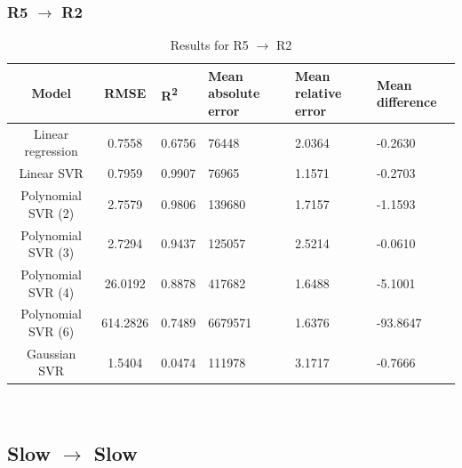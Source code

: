 \documentclass[a4paper,11pt]{article}
\begin{document}
\subsubsection{R5 $\rightarrow$ R2}
\begin{table}[H]
	\centering
	\begin{adjustbox}{center}
		\begin{tabular}{c | c M{1.2cm} M{2.5cm} M{2.5cm} M{1.8cm}}
			Model & RMSE & R\textsuperscript{2} & Mean absolute error & Mean relative error & Mean difference \tabularnewline
			\hline
			Linear regression & 0.7558 & 0.6756 &  76448 & 2.0364 & -0.2630 \\
			Linear SVR & 0.7959 & 0.9907 &  76965 & 1.1571 & -0.2703 \\
			Polynomial SVR (2) & 2.7579 & 0.9806 & 139680 & 1.7157 & -1.1593 \\
			Polynomial SVR (3) & 2.7294 & 0.9437 & 125057 & 2.5214 & -0.0610 \\
			Polynomial SVR (4) & 26.0192 & 0.8878 & 417682 & 1.6488 & -5.1001 \\
			Polynomial SVR (6) & 614.2826 & 0.7489 & 6679571 & 1.6376 & -93.8647 \\
			Gaussian SVR & 1.5404 & 0.0474 & 111978 & 3.1717 & -0.7666 \\
		\end{tabular}
	\end{adjustbox}
	\\
	\caption{Results for R5 $\rightarrow$ R2 }
	\label{fig:query_comp_002}
\end{table}

\subsection{Slow $\rightarrow$ Slow}
\end{document}
